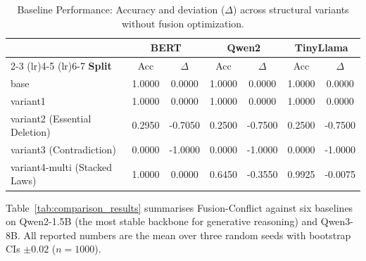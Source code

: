 \documentclass{article}
\begin{document}
\begin{table}[t]
\centering
\small
\begin{tabular}{lcccccc}
\toprule
& \multicolumn{2}{c}{\textbf{BERT}} &
  \multicolumn{2}{c}{\textbf{Qwen2}} &
  \multicolumn{2}{c}{\textbf{TinyLlama}} \\
\cmidrule(lr){2-3} \cmidrule(lr){4-5} \cmidrule(lr){6-7}
\textbf{Split} & Acc & $\Delta$ & Acc & $\Delta$ & Acc & $\Delta$ \\
\midrule
base                            & 1.0000 & 0.0000 & 1.0000 & 0.0000 & 1.0000 & 0.0000 \\
variant1                        & 1.0000 & 0.0000 & 1.0000 & 0.0000 & 1.0000 & 0.0000 \\
variant2 (Essential Deletion)   & 0.2950 & -0.7050 & 0.2500 & -0.7500 & 0.2500 & -0.7500 \\
variant3 (Contradiction)        & 0.0000 & -1.0000 & 0.0000 & -1.0000 & 0.0000 & -1.0000 \\
variant4-multi (Stacked Laws)   & 1.0000 & 0.0000 & 0.6450 & -0.3550 & 0.9925 & -0.0075 \\
\bottomrule
\end{tabular}
\caption{Baseline Performance: Accuracy and deviation ($\Delta$) across structural variants without fusion optimization.}
\label{tab:all_models_deltas}
\end{table}

Table~\ref{tab:comparison_results} summarises Fusion-Conflict against six baselines on Qwen2-1.5B (the most stable backbone for generative reasoning) and Qwen3-8B. All reported numbers are the mean over three random seeds with bootstrap CIs $\pm 0.02$ ($n{=}1000$).
\end{document}
